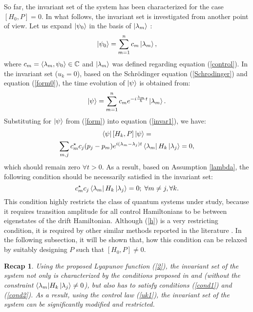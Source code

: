 \documentclass[journal]{IEEEtran}
\newtheorem*{recap}{Recap}
\theoremstyle{definition}
\begin{document}
So far, the invariant set of the system has been characterized for the case $[H_0,P]=0$. In what follows, the invariant set is investigated from another point of view. Let us expand $\ket{\psi_0}$ in the basis of $\ket{\lambda_m}$ \cite{grivopoulos2003lyapunov}:
 \begin{equation}\label{form0}
     \ket{\psi_0}=\displaystyle\sum_{m=1}^{n} c_m\ket{\lambda_m},
 \end{equation}
where $c_m=\braket{\lambda_m,\psi_0}\in \mathbb{C}$ and $\ket{\lambda_m}$ was defined regarding equation (\ref{control}).
In the invariant set ($u_k=0$), based on the Schr\"{o}dinger equation (\ref{Schrodinger}) and equation (\ref{form0}), the time evolution of $\ket{\psi}$ is obtained from:
\begin{equation}\label{form}
     \ket{\psi}=\displaystyle\sum_{m=1}^{n} c_me^{-i\frac{\lambda_m}{\hbar}t}\ket{\lambda_m}.
 \end{equation}
Substituting for $\ket{\psi}$ from (\ref{form}) into equation (\ref{invar1}), we have:
 \begin{multline}\label{c1}
     \bra{\psi}[H_k,P]\ket{\psi} = \\ \displaystyle\sum_{m,j}c_m^{\star}c_j(p_j-p_m)e^{i(\lambda_m-\lambda_j)t}\bra{\lambda_m}H_k\ket{\lambda_j}=0, 
 \end{multline}
which should remain zero $\forall t>0$. As a result, based on Assumption \ref{lambda}, the following condition should be necessarily satisfied in the invariant set:
 \begin{equation}\label{h}
      c_m^{\star}c_j\bra{\lambda_m}H_k\ket{\lambda_j}=0;  \;  \forall m\neq j ,\forall{k}.
 \end{equation}
This condition highly restricts the class of quantum systems under study, because it requires transition amplitude for all control Hamiltonians to be between eigenstates of the drift Hamiltonian. Although (\ref{h}) is a very restricting condition, it is required by other similar methods reported in the literature \cite{kuang2008lyapunov}. In the following subsection, it will be shown that, how this condition can be relaxed by suitably designing $P$ such that $[H_0,P]\neq0$.

\begin{recap}
Using the proposed Lyapunov function (\ref{2}), the invariant set of the system not only is characterized by the conditions proposed in \cite{kuang2008lyapunov} and \cite{shuang2007quantum} (without the constraint ${\bra{\lambda_m}}H_k\ket{\lambda_j}\neq0$), but also has to satisfy conditions (\ref{cond1}) and (\ref{cond2}). As a result, using the control law (\ref{uk1}), the invariant set of the system can be significantly modified and restricted.
\end{recap}
\end{document}
